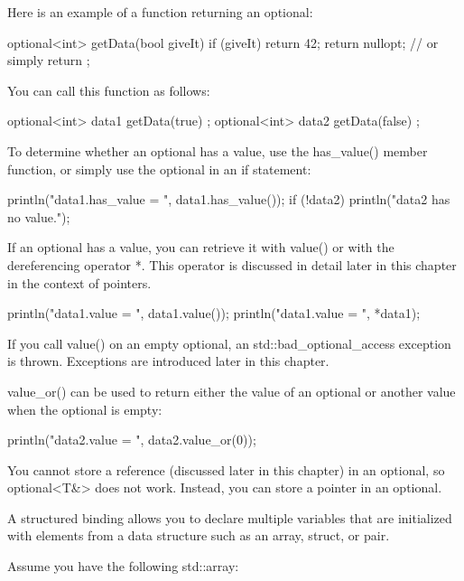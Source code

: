 Here is an example of a function returning an optional:

\begin{cpp}
optional<int> getData(bool giveIt)
{
    if (giveIt) {
        return 42;
    }
    return nullopt; // or simply return {};
}
\end{cpp}

You can call this function as follows:

\begin{cpp}
optional<int> data1 { getData(true) };
optional<int> data2 { getData(false) };
\end{cpp}

To determine whether an optional has a value, use the has\_value() member function, or simply use the optional in an if statement:

\begin{cpp}
println("data1.has_value = {}", data1.has_value());
if (!data2) {
    println("data2 has no value.");
}
\end{cpp}

If an optional has a value, you can retrieve it with value() or with the dereferencing operator *. This operator is discussed in detail later in this chapter in the context of pointers.

\begin{cpp}
println("data1.value = {}", data1.value());
println("data1.value = {}", *data1);
\end{cpp}

If you call value() on an empty optional, an std::bad\_optional\_access exception is thrown. Exceptions are introduced later in this chapter.

value\_or() can be used to return either the value of an optional or another value when the optional is empty:

\begin{cpp}
println("data2.value = {}", data2.value_or(0));
\end{cpp}

You cannot store a reference (discussed later in this chapter) in an optional, so optional<T\&> does not work. Instead, you can store a pointer in an optional.


A structured binding allows you to declare multiple variables that are initialized with elements from a data structure such as an array, struct, or pair.

Assume you have the following std::array:

